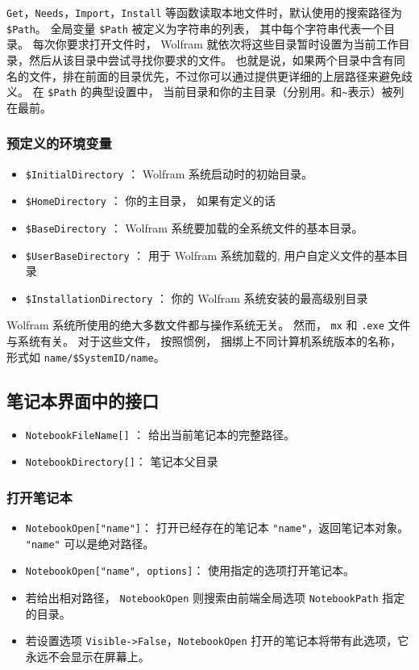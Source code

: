 \verb`Get`，\verb`Needs`，\verb`Import`，\verb`Install` 等函数读取本地文件时，默认使用的搜索路径为 \verb`$Path`。
全局变量 \verb`$Path` 被定义为字符串的列表， 其中每个字符串代表一个目录。
每次你要求打开文件时， Wolfram 就依次将这些目录暂时设置为当前工作目录，然后从该目录中尝试寻找你要求的文件。
也就是说，如果两个目录中含有同名的文件，排在前面的目录优先，不过你可以通过提供更详细的上层路径来避免歧义。
在 \verb`$Path` 的典型设置中， 当前目录和你的主目录（分别用\verb`。`和\verb`~`表示）被列在最前。

\subsubsection{预定义的环境变量}

\begin{itemize}
\item \verb`$InitialDirectory` ： Wolfram 系统启动时的初始目录。
\item \verb`$HomeDirectory` ：  你的主目录， 如果有定义的话
\item \verb`$BaseDirectory` ：  Wolfram 系统要加载的全系统文件的基本目录。
\item \verb`$UserBaseDirectory` ：  用于 Wolfram 系统加载的, 用户自定义文件的基本目录
\item \verb`$InstallationDirectory` ：  你的 Wolfram 系统安装的最高级别目录
\end{itemize}

Wolfram 系统所使用的绝大多数文件都与操作系统无关。 
然而， \verb`mx` 和 \verb`.exe` 文件与系统有关。
对于这些文件， 按照惯例， 捆绑上不同计算机系统版本的名称， 
形式如 \verb`name/$SystemID/name`。

\subsection{笔记本界面中的接口}

\begin{itemize}
\item \verb`NotebookFileName[]` ： 给出当前笔记本的完整路径。
\item \verb`NotebookDirectory[]`： 笔记本父目录
\end{itemize}

\subsubsection{打开笔记本}

\begin{itemize}
\item \verb`NotebookOpen["name"]`：  打开已经存在的笔记本 \verb`"name"`，返回笔记本对象。 \verb`"name"` 可以是绝对路径。
\item \verb`NotebookOpen["name", options]`： 使用指定的选项打开笔记本。
\item 若给出相对路径， \verb`NotebookOpen` 则搜索由前端全局选项 \verb`NotebookPath` 指定的目录。
\item 若设置选项 \verb`Visible->False`，\verb`NotebookOpen` 打开的笔记本将带有此选项，它永远不会显示在屏幕上。
\end{itemize}

